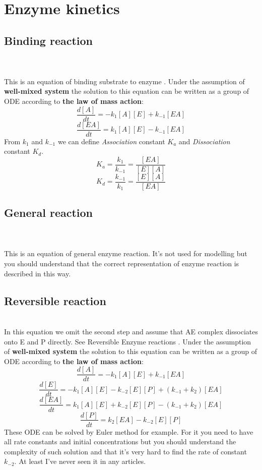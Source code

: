 \documentclass[twoside,twocolumn]{article}
\begin{document}
\section{Enzyme kinetics}
\subsection{Binding reaction}
\label{subsec:enzyme_binding}
\\\\This is an equation of binding substrate to enzyme \cite[p.~135]{sterratt_principles_2011}. Under the assumption of \textbf{well-mixed system}\cite[p.~135]{sterratt_principles_2011} the solution to this equation can be written as a group of ODE according to \textbf{the law of mass action}\cite[p.~10]{bisswanger_enzyme_2002}:
\[ \frac{d[A]}{dt} = -k_{1}[A][E] + k_{-1}[EA]\]
\[ \frac{d[EA]}{dt} = k_{1}[A][E] - k_{-1}[EA]\]
From $k_{1}$ and $k_{-1}$ we can define \textit{Association} constant $K_{a}$ and \textit{Dissociation} constant $K_{d}$.
\[ K_{a} = \frac{k_{1}}{k_{-1}} = \frac{[EA]}{[E][A]} \]
\[ K_{d} = \frac{k_{-1}}{k_{1}} = \frac{[E][A]}{[EA]} \]

\subsection{General reaction}
\label{subsec:enzyme_general}
\\\\This is an equation of general enzyme reaction. It's not used for modelling but you should understand that the correct representation of enzyme reaction is described in this way. 

\subsection{Reversible reaction}
\label{subsec:enzyme_reversible}
\\In this equation we omit the second step and assume that AE complex dissociates onto E and P directly. See Reversible Enzyme reactions \cite[p.~75]{bisswanger_enzyme_2002}. Under the assumption of \textbf{well-mixed system} the solution to this equation can be written as a group of ODE according to \textbf{the law of mass action}:
\[ \frac{d[A]}{dt} = -k_{1}[A][E] + k_{-1}[EA]\]
\[ \frac{d[E]}{dt} = -k_{1}[A][E] - k_{-2}[E][P] + (k_{-1} + k_{2})[EA]\]
\[ \frac{d[EA]}{dt} = k_{1}[A][E] + k_{-2}[E][P] - (k_{-1} + k_{2})[EA]\]
\[ \frac{d[P]}{dt} = k_{2}[EA] - k_{-2}[E][P]\]
These ODE can be solved by Euler method for example. For it you need to have all rate constants and initial concentrations but you should understand the complexity of such solution and that it's very hard to find the rate of constant $k_{-2}$. At least I've never seen it in any articles.
\end{document}
